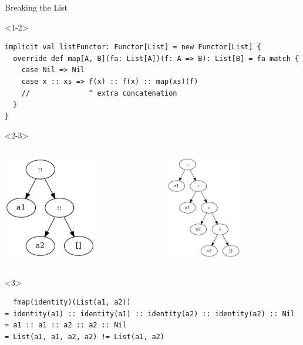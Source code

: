 \documentclass[presentation,aspectratio=169,smaller]{beamer}
\begin{document}
\begin{frame}[label={sec:orgf6cb027},fragile,t]{Breaking the List}
 \begin{onlyenv}<1-2>
\begin{verbatim}
implicit val listFunctor: Functor[List] = new Functor[List] {
  override def map[A, B](fa: List[A])(f: A => B): List[B] = fa match {
    case Nil => Nil
    case x :: xs => f(x) :: f(x) :: map(xs)(f)
    //              ^ extra concatenation
  }
}
\end{verbatim}
\end{onlyenv}

\begin{onlyenv}<2-3>
\begin{columns}
\begin{column}[t]{0.5\columnwidth}
\begin{center}
\includegraphics[height=4.5cm]{.dot/functor-list-broken-1.png}
\end{center}
\end{column}

\begin{column}[t]{0.5\columnwidth}
\begin{center}
\includegraphics[height=4.5cm]{.dot/functor-list-broken-2.png}
\end{center}
\end{column}
\end{columns}
\end{onlyenv}

\begin{onlyenv}<3>
\begin{verbatim}
  fmap(identity)(List(a1, a2))
= identity(a1) :: identity(a1) :: identity(a2) :: identity(a2) :: Nil
= a1 :: a1 :: a2 :: a2 :: Nil
= List(a1, a1, a2, a2) != List(a1, a2)
\end{verbatim}
\end{onlyenv}
\end{frame}
\end{document}
